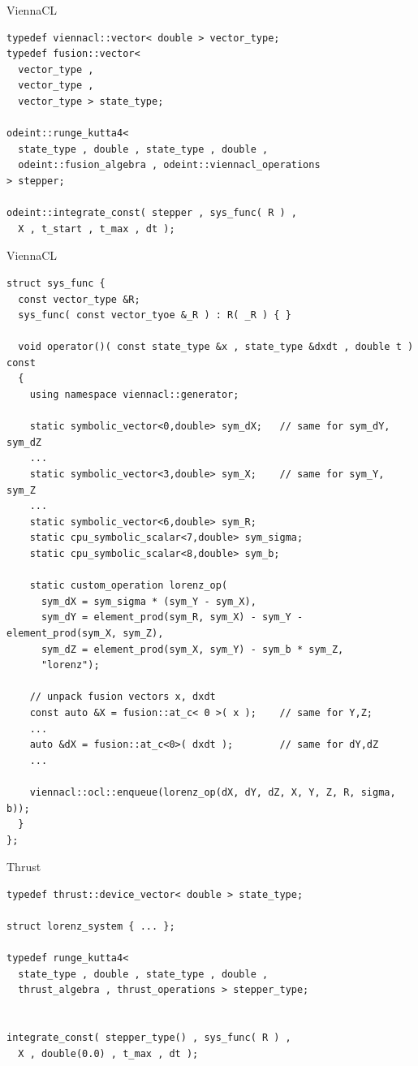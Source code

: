 \documentclass{beamer}
\newcommand{\heading}[1]{\centerline{\Large #1} \vspace{0.5em}}
\begin{document}
\begin{frame}[fragile]
 \heading{ViennaCL}

\begin{lstlisting}[basicstyle=\scriptsize\ttfamily]
typedef viennacl::vector< double > vector_type;
typedef fusion::vector<
  vector_type ,
  vector_type ,
  vector_type > state_type;

odeint::runge_kutta4<
  state_type , double , state_type , double ,
  odeint::fusion_algebra , odeint::viennacl_operations
> stepper;

odeint::integrate_const( stepper , sys_func( R ) ,
  X , t_start , t_max , dt );
\end{lstlisting}

\end{frame}


\begin{frame}[fragile]
 \heading{ViennaCL}

\begin{lstlisting}[basicstyle=\tiny\ttfamily]
struct sys_func {
  const vector_type &R;
  sys_func( const vector_tyoe &_R ) : R( _R ) { }

  void operator()( const state_type &x , state_type &dxdt , double t ) const
  {
    using namespace viennacl::generator;

    static symbolic_vector<0,double> sym_dX;   // same for sym_dY, sym_dZ
    ... 
    static symbolic_vector<3,double> sym_X;    // same for sym_Y, sym_Z
    ... 
    static symbolic_vector<6,double> sym_R;
    static cpu_symbolic_scalar<7,double> sym_sigma;
    static cpu_symbolic_scalar<8,double> sym_b;

    static custom_operation lorenz_op(
      sym_dX = sym_sigma * (sym_Y - sym_X),
      sym_dY = element_prod(sym_R, sym_X) - sym_Y - element_prod(sym_X, sym_Z),
      sym_dZ = element_prod(sym_X, sym_Y) - sym_b * sym_Z,
      "lorenz");

    // unpack fusion vectors x, dxdt
    const auto &X = fusion::at_c< 0 >( x );    // same for Y,Z;
    ...
    auto &dX = fusion::at_c<0>( dxdt );        // same for dY,dZ
    ...

    viennacl::ocl::enqueue(lorenz_op(dX, dY, dZ, X, Y, Z, R, sigma, b));
  }
};
\end{lstlisting}

\end{frame}



\begin{frame}[fragile]
 \heading{Thrust}


\begin{lstlisting}[basicstyle=\scriptsize\ttfamily]
typedef thrust::device_vector< double > state_type;

struct lorenz_system { ... };

typedef runge_kutta4<
  state_type , double , state_type , double ,
  thrust_algebra , thrust_operations > stepper_type;


integrate_const( stepper_type() , sys_func( R ) ,
  X , double(0.0) , t_max , dt );
\end{lstlisting}

\end{frame}
\end{document}
